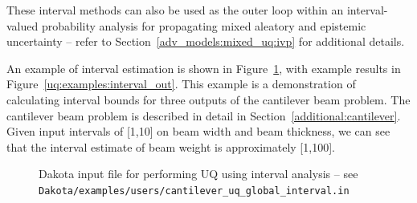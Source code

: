 These interval methods can also be used as the outer loop within an
interval-valued probability analysis for propagating mixed aleatory
and epistemic uncertainty -- refer to
Section~\ref{adv_models:mixed_uq:ivp} for additional details.



 
An example of interval estimation 
is shown in Figure~\ref{uq:examples:interval_input}, with example results in 
Figure~\ref{uq:examples:interval_out}. This example is a demonstration 
of calculating interval bounds for three outputs of the cantilever beam 
problem. The cantilever beam problem is described in detail in 
Section~\ref{additional:cantilever}. Given input intervals of [1,10] on 
beam width and beam thickness, we can see that the interval estimate of 
beam weight is approximately [1,100].

\begin{figure}[htbp!]
  \centering
  \begin{bigbox}
    \begin{small}
    \end{small}
  \end{bigbox}
\caption{Dakota input file for performing UQ using interval analysis --
see \texttt{Dakota/examples/users/cantilever\_uq\_global\_interval.in} }
\label{uq:examples:interval_input}
\end{figure}

